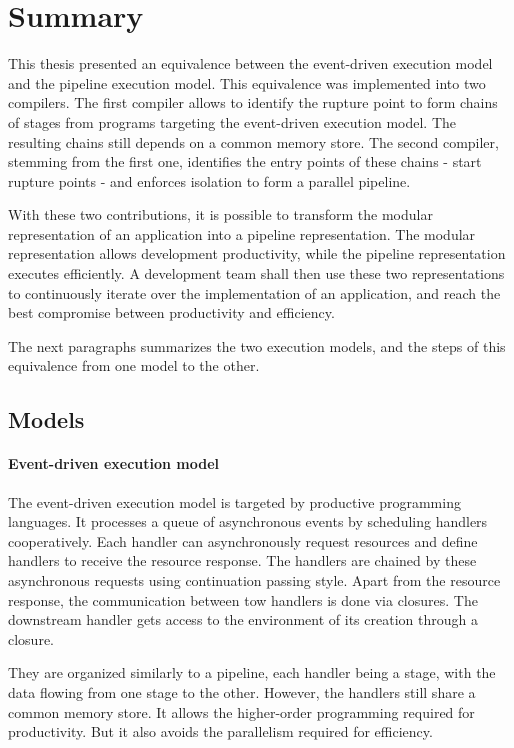 \section{Summary} \label{chapter6:summary}

This thesis presented an equivalence between the event-driven execution model and the pipeline execution model.
This equivalence was implemented into two compilers.
The first compiler allows to identify the rupture point to form chains of stages from programs targeting the event-driven execution model.
The resulting chains still depends on a common memory store.
The second compiler, stemming from the first one, identifies the entry points of these chains - start rupture points - and enforces isolation to form a parallel pipeline.

With these two contributions, it is possible to transform the modular representation of an application into a pipeline representation.
The modular representation allows development productivity, while the pipeline representation executes efficiently.
A development team shall then use these two representations to continuously iterate over the implementation of an application, and reach the best compromise between productivity and efficiency.

The next paragraphs summarizes the two execution models, and the steps of this equivalence from one model to the other.

\subsection{Models} \label{chapter7:summary:model}

\paragraph{Event-driven execution model}

The event-driven execution model is targeted by productive programming languages.
It processes a queue of asynchronous events by scheduling handlers cooperatively.
Each handler can asynchronously request resources and define handlers to receive the resource response. 
The handlers are chained by these asynchronous requests using continuation passing style.
Apart from the resource response, the communication between tow handlers is done via closures.
The downstream handler gets access to the environment of its creation through a closure.

They are organized similarly to a pipeline, each handler being a stage, with the data flowing from one stage to the other.
However, the handlers still share a common memory store.
It allows the higher-order programming required for productivity.
But it also avoids the parallelism required for efficiency.

